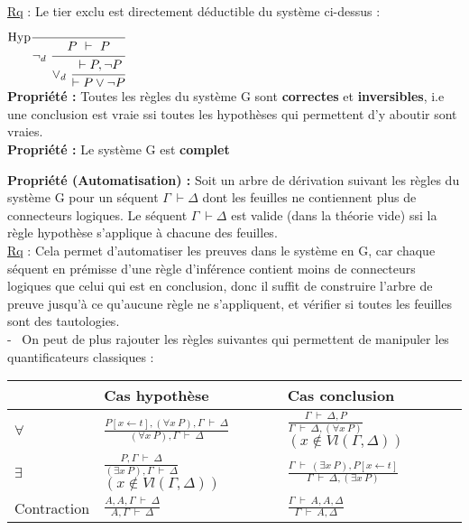\documentclass[11pt,a4paper]{article}
\begin{document}
\underline{Rq} : Le tier exclu est directement déductible du système ci-dessus : 
$\text{Hyp}\cfrac{}{\lnot_d \ \cfrac{P \ \vdash \ P}{\lor_d \ \cfrac{\vdash P, \lnot P}{\vdash P \lor \lnot P}}}$ \\

\textbf{Propriété :} Toutes les règles du système G sont \textbf{correctes} et \textbf{inversibles}, i.e une conclusion est vraie ssi toutes les hypothèses qui permettent d'y aboutir sont vraies. \\

\textbf{Propriété :} Le système G est \textbf{complet}

\textbf{Propriété (Automatisation) :} Soit un arbre de dérivation suivant les règles du système G pour un séquent $\Gamma \ \vdash \Delta$ dont les feuilles ne contiennent plus de connecteurs logiques. Le séquent $\Gamma \ \vdash \Delta$ est valide (dans la théorie vide) ssi la règle hypothèse s’applique à chacune des feuilles. \\

\underline{Rq} : Cela permet d'automatiser les preuves dans le système en G, car chaque séquent en prémisse d’une règle d’inférence contient moins de connecteurs logiques que celui qui est en conclusion, donc il suffit de construire l'arbre de preuve jusqu'à ce qu'aucune règle ne s'appliquent, et vérifier si toutes les feuilles sont des tautologies. \\

- \ On peut de plus rajouter les règles suivantes qui permettent de manipuler les quantificateurs classiques : \\


\begin{tabular}{|C{3cm}|C{6cm}|C{7cm}|}
  \hline
  & Cas hypothèse & Cas conclusion \\
  \hline
  $\forall$ & {\Large $\frac{P[x \leftarrow t], (\forall x \ P), \Gamma \ \vdash \ \Delta}{(\forall x \ P),\Gamma \  \vdash \  \Delta}$} & {\Large $\frac{\Gamma \  \vdash \ \Delta,P}{\Gamma \  \vdash \ \Delta,(\forall x \ P) }$}$(x \notin Vl(\Gamma, \Delta))$\\
  \hline
  $\exists$ & {\Large $\frac{P,\Gamma \ \vdash \ \Delta }{(\exists x \ P),\Gamma \  \vdash \ \Delta}$}$(x \notin Vl(\Gamma,\Delta))$ & {\Large $\frac{\Gamma \ \vdash \ (\exists x \ P),P[x \leftarrow t]}{\Gamma \  \vdash \ \Delta,(\exists x \ P)}$} \\
  \hline
  Contraction & {\Large $\frac{A,A,\Gamma \ \vdash \ \Delta}{A,\Gamma \ \vdash \ \Delta }$} & {\Large $\frac{\Gamma \ \vdash \ A,A,\Delta}{\Gamma \ \vdash \ A,\Delta }$ } \\
  \hline 
\end{tabular}
\\
\\
\end{document}
